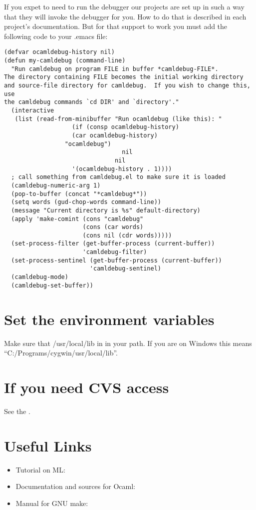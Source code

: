 \documentclass{article}
\begin{document}
 If you expet to need to run the debugger our projects are set up in such a
way that they will invoke the debugger for you. How to do that is described in
each project's documentation. But for that support to work you must add the
following code to your .emacs file:
\begin{verbatim}
(defvar ocamldebug-history nil)
(defun my-camldebug (command-line)
  "Run camldebug on program FILE in buffer *camldebug-FILE*.
The directory containing FILE becomes the initial working directory
and source-file directory for camldebug.  If you wish to change this, use
the camldebug commands `cd DIR' and `directory'."
  (interactive
   (list (read-from-minibuffer "Run ocamldebug (like this): "
			       (if (consp ocamldebug-history)
				   (car ocamldebug-history)
				 "ocamldebug")
                                 nil
                               nil
			       '(ocamldebug-history . 1))))
  ; call something from camldebug.el to make sure it is loaded
  (camldebug-numeric-arg 1)
  (pop-to-buffer (concat "*camldebug*"))
  (setq words (gud-chop-words command-line)) 
  (message "Current directory is %s" default-directory)
  (apply 'make-comint (cons "camldebug"
                      (cons (car words)
                      (cons nil (cdr words)))))
  (set-process-filter (get-buffer-process (current-buffer))
                      'camldebug-filter)
  (set-process-sentinel (get-buffer-process (current-buffer))
                        'camldebug-sentinel)
  (camldebug-mode)
  (camldebug-set-buffer))
\end{verbatim}


\section{Set the environment variables}

 Make sure that /usr/local/lib in in your path. If you are on Windows this
 means ``C:/Programs/cygwin/usr/local/lib''. 


\section{If you need CVS access} 

 See the .


\section{Useful Links}
\begin{itemize}
 \item  Tutorial on ML: 
  \item Documentation and sources for Ocaml: 
  \item Manual for GNU make:

    
 \end{itemize}
\end{document}
